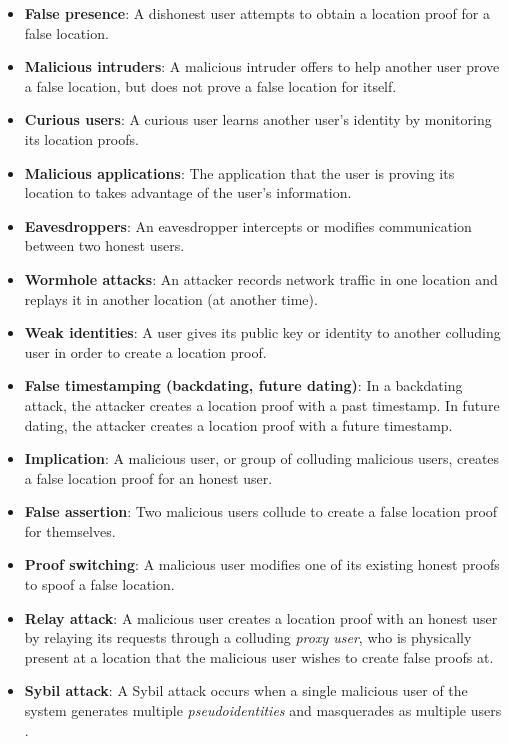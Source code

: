 \begin{itemize}
	\item[] \textbf{False presence}: A dishonest user attempts to obtain a location proof for a false location.
	\item[] \textbf{Malicious intruders}: A malicious intruder offers to help another user prove a false location, but does not prove a false location for itself.
	\item[] \textbf{Curious users}: A curious user learns another user's identity by monitoring its location proofs.
	\item[] \textbf{Malicious applications}: The application that the user is proving its location to takes advantage of the user's information.
	\item[] \textbf{Eavesdroppers}: An eavesdropper intercepts or modifies communication between two honest users.
	\item[] \textbf{Wormhole attacks}: An attacker records network traffic in one location and replays it in another location (at another time).
	\item[] \textbf{Weak identities}: A user gives its public key or identity to another colluding user in order to create a location proof.
	\item[] \textbf{False timestamping (backdating, future dating)}: In a backdating attack, the attacker creates a location proof with a past timestamp. In future dating, the attacker creates a location proof with a future timestamp.
	\item[] \textbf{Implication}: A malicious user, or group of colluding malicious users, creates a false location proof for an honest user.
	\item[] \textbf{False assertion}: Two malicious users collude to create a false location proof for themselves.
	\item[] \textbf{Proof switching}: A malicious user modifies one of its existing honest proofs to spoof a false location.
	\item[] \textbf{Relay attack}: A malicious user creates a location proof with an honest user by relaying its requests through a colluding \textit{proxy user}, who is physically present at a location that the malicious user wishes to create false proofs at.
	\item[] \textbf{Sybil attack}: A Sybil attack occurs when a single malicious user of the system generates multiple \textit{pseudoidentities} and masquerades as multiple users \cite{sybil}.
\end{itemize}